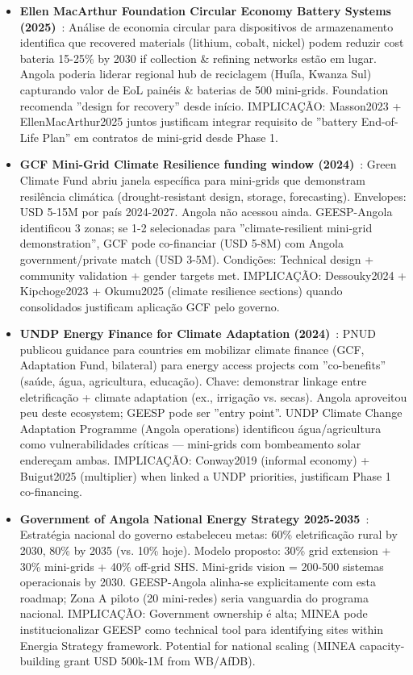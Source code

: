 \documentclass[12pt, a4paper]{article}
\begin{document}
\begin{itemize}
  \item \textbf{Ellen MacArthur Foundation Circular Economy Battery Systems (2025)}~\citep{EllenMacArthur2025}: Análise de economia circular para dispositivos de armazenamento identifica que recovered materials (lithium, cobalt, nickel) podem reduzir cost bateria 15-25\% by 2030 if collection \& refining networks estão em lugar. Angola poderia liderar regional hub de reciclagem (Huíla, Kwanza Sul) capturando valor de EoL painéis \& baterias de 500 mini-grids. Foundation recomenda ''design for recovery'' desde início. IMPLICAÇÃO: Masson2023 + EllenMacArthur2025 juntos justificam integrar requisito de ''battery End-of-Life Plan'' em contratos de mini-grid desde Phase 1.
  
  \item \textbf{GCF Mini-Grid Climate Resilience funding window (2024)}~\citep{GCF2024}: Green Climate Fund abriu janela específica para mini-grids que demonstram resilência climática (drought-resistant design, storage, forecasting). Envelopes: USD 5-15M por país 2024-2027. Angola não acessou ainda. GEESP-Angola identificou 3 zonas; se 1-2 selecionadas para ''climate-resilient mini-grid demonstration'', GCF pode co-financiar (USD 5-8M) com Angola government/private match (USD 3-5M). Condições: Technical design + community validation + gender targets met. IMPLICAÇÃO: Dessouky2024 + Kipchoge2023 + Okumu2025 (climate resilience sections) quando consolidados justificam aplicação GCF pelo governo.
  
  \item \textbf{UNDP Energy Finance for Climate Adaptation (2024)}~\citep{UNDP2024}: PNUD publicou guidance para countries em mobilizar climate finance (GCF, Adaptation Fund, bilateral) para energy access projects com ''co-benefits'' (saúde, água, agricultura, educação). Chave: demonstrar linkage entre eletrificação + climate adaptation (ex., irrigação vs. secas). Angola aproveitou peu deste ecosystem; GEESP pode ser ''entry point''. UNDP Climate Change Adaptation Programme (Angola operations) identificou água/agricultura como vulnerabilidades críticas — mini-grids com bombeamento solar endereçam ambas. IMPLICAÇÃO: Conway2019 (informal economy) + Buigut2025 (multiplier) when linked a UNDP priorities, justificam Phase 1 co-financing.
  
  \item \textbf{Government of Angola National Energy Strategy 2025-2035}~\citep{Angola2025}: Estratégia nacional do governo estabeleceu metas: 60\% eletrificação rural by 2030, 80\% by 2035 (vs. 10\% hoje). Modelo proposto: 30\% grid extension + 30\% mini-grids + 40\% off-grid SHS. Mini-grids vision = 200-500 sistemas operacionais by 2030. GEESP-Angola alinha-se explicitamente com esta roadmap; Zona A piloto (20 mini-redes) seria vanguardia do programa nacional. IMPLICAÇÃO: Government ownership é alta; MINEA pode institucionalizar GEESP como technical tool para identifying sites within Energia Strategy framework. Potential for national scaling (MINEA capacity-building grant USD 500k-1M from WB/AfDB).
  

\end{itemize}
\end{document}
